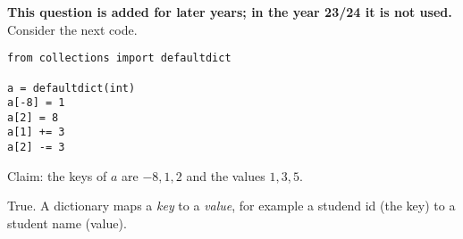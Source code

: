 \documentclass[stochastic-or.tex]{subfiles}
\begin{document}
\begin{truefalse} \textbf{This question is added for later years; in the year 23/24 it is not used.}
Consider the next code.
\begin{verbatim}
from collections import defaultdict

a = defaultdict(int)
a[-8] = 1
a[2] = 8
a[1] += 3
a[2] -= 3
\end{verbatim}
Claim:  the keys of $a$ are $-8, 1, 2$ and the values $1, 3, 5$.
\begin{solution}
True. A dictionary maps a \emph{key} to a \emph{value}, for example  a studend id (the key) to a student name (value).
\end{solution}
\end{truefalse}



\end{document}
